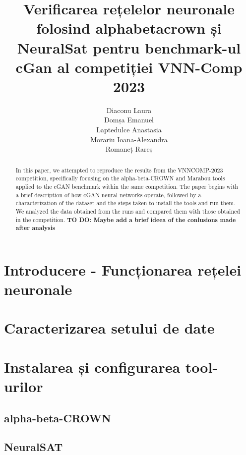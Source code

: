 \documentclass[12pt,a4paper]{report}
\title{Verificarea rețelelor neuronale folosind alpha\textunderscore beta\textunderscore crown și NeuralSat pentru benchmark-ul cGan al competiției VNN-Comp 2023}
\author{ Diaconu Laura\\ Domșa Emanuel\\Laptedulce Anastasia \\ Morariu Ioana-Alexandra \\ Romaneț Rareș}
\date{}
\begin{document}
\maketitle


\begin{abstract}
In this paper, we attempted to reproduce the results from the VNNCOMP-2023 competition, specifically focusing on the alpha-beta-CROWN and Marabou tools applied to the cGAN benchmark within the same competition. The paper begins with a brief description of how cGAN neural networks operate, followed by a characterization of the dataset and the steps taken to install the tools and run them. We analyzed the data obtained from the runs and compared them with those obtained in the competition. \textbf{TO DO: Maybe add a brief ideea of the conlusions made after analysis}
\end{abstract}
\tableofcontents
\newpage

\section{Introducere - Funcționarea rețelei neuronale}




\section{Caracterizarea setului de date}




\section{Instalarea și configurarea tool-urilor}

    \subsection{alpha-beta-CROWN}
    
    \subsection{NeuralSAT}
    
\end{document}
